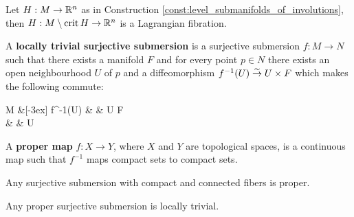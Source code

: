 \documentclass[main.tex]{subfiles}
\begin{document}
\begin{remark}
	Let $H : M \to \mathbb{R}^n$ as in Construction \ref{const:level_submanifolds_of_involutions}, then $H : M \setminus \operatorname{crit} H \to \mathbb{R}^n$ is a Lagrangian fibration.
\end{remark}

\begin{definition}
	A \textbf{locally trivial surjective submersion} is a surjective submersion $f: M \to N$ such that there exists a manifold $F$ and for every point $p \in N$ there exists an open neighbourhood $U$ of $p$ and a diffeomorphism $f^{-1}(U) \overset{\sim}\to U \times F$ which makes the following commute:
	\begin{diagram}
		M  \&[-3ex] f^{-1}(U)   \& \& U \times F \\
		\& \& U
	\end{diagram}
\end{definition}

\begin{definition}
	A \textbf{proper map} $f: X \to Y$, where $X$ and $Y$ are topological spaces, is a continuous map such that $f^{-1}$ maps compact sets to compact sets.
\end{definition}

\begin{lemma}
\label{lemma:subm_is_proper}
	Any surjective submersion with compact and connected fibers is proper.
\end{lemma}

\begin{lemma}[Ehresmann]
\label{lemma:ehresmann}
	Any proper surjective submersion is locally trivial.
\end{lemma}
\end{document}
